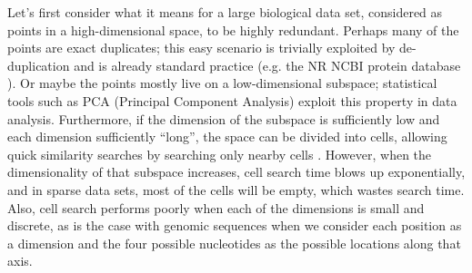 \documentclass[review,preprint,12pt]{elsarticle}
\renewcommand{\cite}{\citep} %
\theoremstyle{definition}
\theoremstyle{remark}
\numberwithin{equation}{section}
\begin{document}
Let's first consider what it means for a large biological data set, considered as points in a high-dimensional space, to be highly redundant.
Perhaps many of the points are exact duplicates; this easy scenario is trivially exploited by de-duplication and is already standard practice (e.g. the NR NCBI protein database \cite{pruitt2005ncbi}).
Or maybe the points mostly live on a low-dimensional subspace; statistical tools such as PCA (Principal Component Analysis) exploit this property in data analysis.
Furthermore, if the dimension of the subspace is sufficiently low and each dimension sufficiently ``long'',
the space can be divided into cells, allowing quick similarity searches by searching only nearby cells \cite{weber1998quantitative}.
However, when the dimensionality of that subspace increases, cell search time blows up exponentially, and in sparse data sets, most of the cells will be empty, which wastes search time.
Also, cell search performs poorly when each of the dimensions is small and discrete, as is the case with genomic sequences when we consider each position as a dimension and the four possible nucleotides as the possible locations along that axis.
\end{document}
